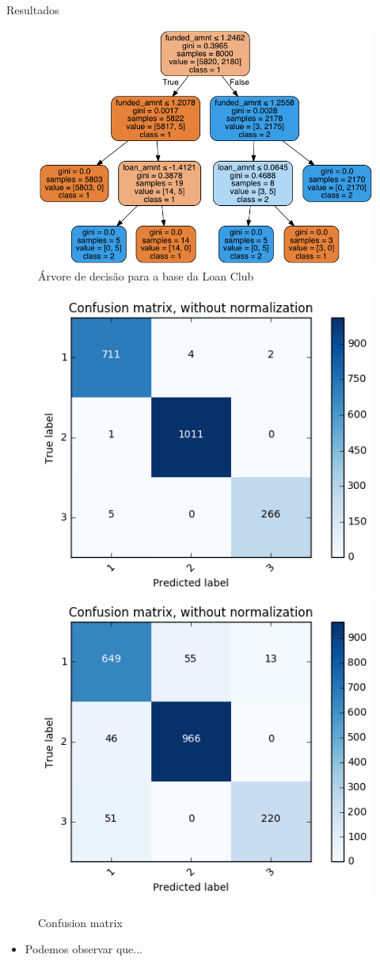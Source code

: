 \documentclass[final,hyperref={pdfpagelabels=false, brazil}]{beamer}
\begin{document}
\begin{frame}[t]
\begin{columns}[t]
\begin{column}{.465\textwidth}
\begin{block}{Resultados}
\begin{itemize}
\begin{figure}
\includegraphics[width=0.7\linewidth]{loan.png}
\caption{Árvore de decisão para a base da Loan Club}
\end{figure}
\end{itemize}

\begin{figure}
\includegraphics[width=0.4\linewidth]{confusionMatrix.png}
\vspace{1cm}
\includegraphics[width=0.4\linewidth]{confusionMatrixRanFor.png}
\caption{Confusion matrix}
\end{figure}

\begin{itemize}
\item Podemos observar que...

\end{itemize}

\end{block}


\end{column}
\end{columns}
\end{frame}
\end{document}
